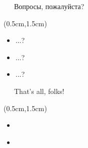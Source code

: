 \documentclass[xetex,18pt,aspectratio=43]{beamer}
\begin{document}
\begin{Large}
\begin{frame}{\ \ \ Вопросы, пожалуйста?}
\begin{textblock*}{\framewidth-0.8cm}(0.5cm,1.5cm)
\begin{itemize}
  \item ...?
  \item ...?
  \item ...?
\end{itemize}
\end{textblock*}
\end{frame}

\begin{frame}{\ \ \ That's all, folks!}
\begin{textblock*}{\framewidth-0.8cm}(0.5cm,1.5cm)
\begin{itemize}
  \item \href{mailto:alex@gitinsky.com}{\color{blue}{alex@gitinsky.com}}
  \item \href{https://telegram.me/lhommequipleure}{\color{blue}{https://telegram.me/lhommequipleure}}
\end{itemize}
\end{textblock*}
\end{frame}
\end{Large}
\end{document}

